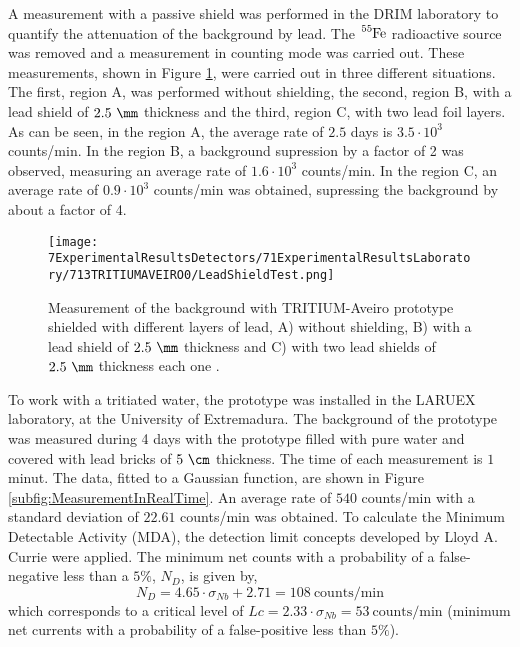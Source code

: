 A measurement with a passive shield was performed in the DRIM laboratory to quantify the attenuation of the background by lead. The $\ce{^{55}Fe}$ radioactive source was removed and a measurement in counting mode was carried out. These measurements, shown in Figure \ref{fig:LeadShieldTest}, were carried out in three different situations. The first, region A, was performed without shielding, the second, region B, with a lead shield of $2.5~\mm$ thickness and the third, region C, with two lead foil layers. As can be seen, in the region A, the average rate of $2.5$ days is $3.5 \cdot{} 10^3$ counts/min. In the region B, a background supression by a factor of 2 was observed, measuring an average rate of $1.6 \cdot{} 10^3$ counts/min. In the region C, an average rate of $0.9 \cdot{} 10^3$ counts/min was obtained, supressing the background by about a factor of 4.

\begin{figure}[h]
\centering
\texttt{[image: 7ExperimentalResultsDetectors/71ExperimentalResultsLaboratory/713TRITIUMAVEIRO0/LeadShieldTest.png]}
\caption{Measurement of the background with TRITIUM-Aveiro prototype shielded with different layers of lead, A) without shielding, B) with a lead shield of $2.5~\mm$ thickness and C) with two lead shields of $2.5~\mm$ thickness each one \cite{ExperimentalPaperCarlos}.\label{fig:LeadShieldTest}}
\end{figure}


To work with a tritiated water, the prototype was installed in the LARUEX laboratory, at the University of Extremadura. The background of the prototype was measured during 4 days with the prototype filled with pure water and covered with lead bricks of $5~\cm$ thickness. The time of each measurement is $1$ minut. The data, fitted to a Gaussian function, are shown in Figure \ref{subfig:MeasurementInRealTime}. An average rate of $540$ counts/min with a standard deviation of $22.61$ counts/min was obtained. To calculate the Minimum Detectable Activity (MDA), the detection limit concepts developed by Lloyd A. Currie \cite{CurieLimit} were applied.  The minimum net counts with a probability of a false-negative less than a $5\%$, $N_D$, is given by,
\begin{equation}
N_D = 4.65 \cdot{}\sigma_{Nb} + 2.71 = 108~\text{counts/min}
\label{eq:EquationNetCounts}
\end{equation}
which corresponds to a critical level of $Lc = 2.33\cdot{}\sigma_{Nb}=53 ~\text{counts/min}$ (minimum net currents with a probability of a false-positive less than $5\%$).


